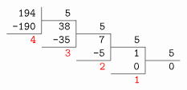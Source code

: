 \documentclass{article}
\newcommand\ttnum[1]{\texttt{#1}}
\newcommand\mr[1]{\multicolumn{1}{r|}{\ttnum{#1}}}
\newcommand\mc[1]{\multicolumn{1}{wr{\widthof{\ttnum{-194}}}}{\ttnum{#1}}}
\newcommand\red[1]{\multicolumn{1}{r}{\textcolor{red}{\ttnum{#1}}}}
\begin{document}
\pagestyle{empty}
\Large
\setlength\arraycolsep{1pt} %
\[
\begin{array}{@{} *{12}{r} @{}}
\mr{194}  & \mc{5} \\
\cline{2-2}
\mr{-190} & \mr{38} & \mc{5} \\
\cline{1-1} \cline{3-3}
\red{4} & \mr{-35} & \mr{7} & \mc{5} \\
\cline{2-2} \cline{4-4}
& \red{3} & \mr{-5} & \mr{1} & \mc{5} \\
\cline{3-3} \cline{5-5}
& & \red{2} & \mr{0} & \mc{0} \\
\cline{4-4}
& & & \red{1}
\end{array}
\]
\end{document}
